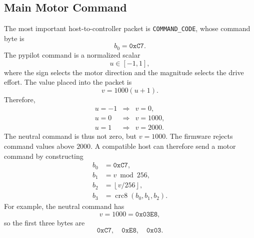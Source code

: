 \documentclass[11pt,twocolumn]{article}
\begin{document}
\subsection{Main Motor Command}
The most important host-to-controller packet is
\texttt{COMMAND\_CODE}, whose command byte is
\[
b_0 = \mathtt{0xC7}.
\]
The pypilot command is a normalized scalar
\[
u \in [-1,1],
\]
where the sign selects the motor direction and the magnitude selects the
drive effort.  The value placed into the packet is
\[
v = 1000(u+1).
\]
Therefore,
\[
\begin{array}{lll}
u=-1 &\Rightarrow& v=0,\\
u=0 &\Rightarrow& v=1000,\\
u=1 &\Rightarrow& v=2000.
\end{array}
\]
The neutral command is thus not zero, but \(v=1000\).  The firmware
rejects command values above \(2000\).  A compatible host can therefore
send a motor command by constructing
\[
\begin{aligned}
b_0 &= \mathtt{0xC7},\\
b_1 &= v \bmod 256,\\
b_2 &= \left\lfloor v/256 \right\rfloor,\\
b_3 &= \operatorname{crc8}(b_0,b_1,b_2).
\end{aligned}
\]
For example, the neutral command has
\[
v = 1000 = \mathtt{0x03E8},
\]
so the first three bytes are
\[
\mathtt{0xC7},\quad \mathtt{0xE8},\quad \mathtt{0x03}.
\]
\end{document}
